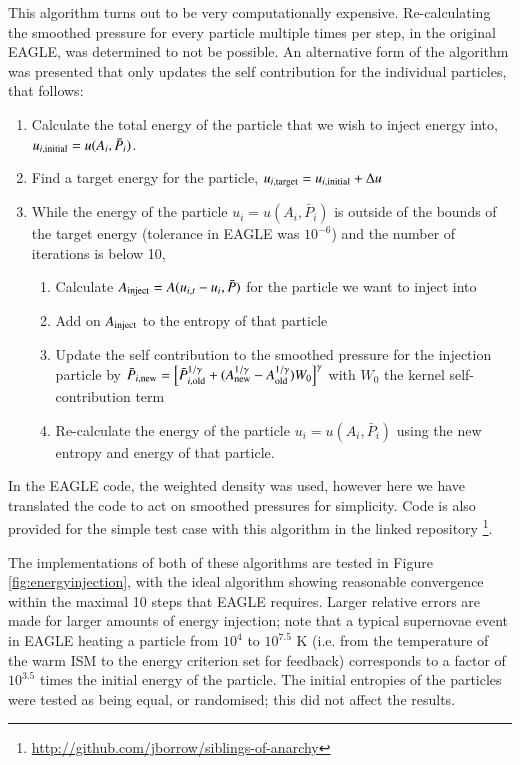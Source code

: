 This algorithm turns out to be very computationally expensive. Re-calculating
the smoothed pressure for every particle multiple times per step, in the
original EAGLE, was determined to not be possible. An alternative form
of the algorithm was presented that only updates the self contribution
for the individual particles, that follows:
\begin{enumerate}
    \item Calculate the total energy of the particle that we
          wish to inject energy into, $u_{i, {\rm initial}} = u(A_i, \bar{P}_i)$.
    \item Find a target energy for the particle, $u_{i, {\rm target}} = 
          u_{i, {\rm initial}} + \Delta u$
    \item While the energy of the particle $u_i = u(A_i, \bar{P}_i)$
          is outside of the bounds of the target energy (tolerance in EAGLE
          was $10^{-6}$) and the number of iterations is below 10,
    \begin{enumerate}
        \item Calculate $A_{\rm inject} = A(u_{i, t} - u_i,
              \bar{P})$ for the particle we want to inject into
        \item Add on $A_{\rm inject}$ to the entropy of that particle
        \item Update the self contribution to the smoothed pressure for 
              the injection particle by
              $\bar{P}_{i, {\rm new}} = \left[ \bar{P}_{i, {\rm old}}^{1/\gamma} +
              (A_{\rm new}^{1 / \gamma} - A_{\rm old}^{1 / \gamma})W_0 \right]^\gamma$
              with $W_0$ the kernel self-contribution term
        \item Re-calculate the energy of the particle $u_i = u(A_i, \bar{P}_i)$
              using the new entropy and energy of that particle.
    \end{enumerate}
\end{enumerate}
In the EAGLE code, the weighted density was used, however here we have translated
the code to act on smoothed pressures for simplicity. Code is also
provided for the simple test case with this algorithm in the linked repository
\footnote{\url{http://github.com/jborrow/siblings-of-anarchy}}.

The implementations of both of these algorithms are tested in Figure
\ref{fig:energyinjection}, with the ideal algorithm showing reasonable
convergence within the maximal 10 steps that EAGLE requires. Larger relative
errors are made for larger amounts of energy injection; note that a typical
supernovae event in EAGLE heating a particle from $10^{4}$ to $10^{7.5}$ K
(i.e. from the temperature of the warm ISM to the energy criterion set for
feedback) corresponds to a factor of $10^{3.5}$ times the initial energy of
the particle. The initial entropies of the particles were tested as being
equal, or randomised; this did not affect the results.

